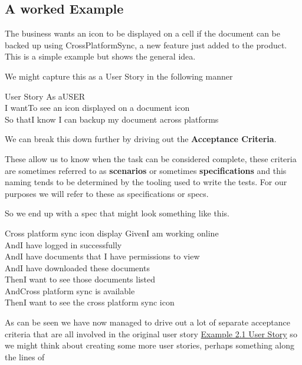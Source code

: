 \documentclass[a4paper, titlepage]{article}
\begin{document}
  \subsection{A worked Example}

  The business wants an icon to be displayed on a cell if the document can be backed
  up using CrossPlatformSync, a new feature just added to the product. 
  This is a simple example but shows the general idea.

  We might capture this as a User Story in the following manner
  \begin{tspec}{1.0}{User Story}
    \centering
      \ac{As a}{USER}\\
      \ac{I want}{To see an icon displayed on a document icon}\\
      \ac{So that}{I know I can backup my document across platforms}
  \end{tspec}

  We can break this down further by driving out the \textbf{Acceptance
  Criteria}.
  
  These allow us to know when the task can be considered
  complete, these criteria are sometimes referred to as
  \textbf{scenarios} or sometimes \textbf{specifications} and this
  naming tends to be determined by the tooling used to write the tests.
  For our purposes we will refer to these as specifications or specs.
  
  So we end up with a spec that might look something like this.

  \begin{tspec}{1}{Cross platform sync icon display}
      \ac{Given}{I am working online}\\
    \ac{And}{I have logged in successfully}\\
    \ac{And}{I have documents that I have permissions to view}\\
    \ac{And}{I have downloaded these documents}\\
    \ac{Then}{I want to see those documents listed}\\
    \ac{And}{Cross platform sync is available}\\
    \ac{Then}{I want to see the cross platform sync icon}\\
  \end{tspec}

  As can be seen we have now managed to drive out a lot of separate
  acceptance criteria that are all involved in the original user story \hyperref[Ex:User Story]{Example 2.1 User Story}
  so we might think about creating some more user stories, perhaps
  something along the lines of
\end{document}
